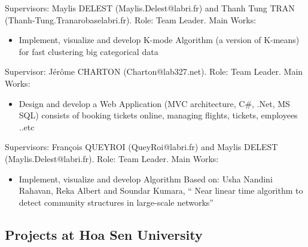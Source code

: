 \documentclass[11pt,a4paper,sans]{moderncv/moderncv}        %
\begin{document}
{Supervisors: Maylis DELEST (Maylis.Delest@labri.fr) and Thanh Tung TRAN (Thanh-Tung.Tranarobaselabri.fr).\newline{}%
Role: Team Leader.\newline{}%
Main Works:%
\begin{itemize}%
 \item Implement, visualize and develop K-mode Algorithm (a version of K-means) for fast clustering big categorical data 
\end{itemize}}

{Supervisor: Jérôme CHARTON (Charton@lab327.net).\newline{}%
Role: Team Leader.\newline{}%
Main Works:%
\begin{itemize}%
 \item Design and develop a Web Application (MVC architecture, C\#, .Net, MS SQL) consists of booking tickets online, managing flights, tickets, employees ..etc
\end{itemize}}

{Supervisors: François QUEYROI (QueyRoi@labri.fr) and Maylis DELEST  (Maylis.Delest@labri.fr).\newline{}%
Role: Team Leader.\newline{}%
Main Works:%
\begin{itemize}%
 \item Implement, visualize and develop Algorithm 
Based on: Usha Nandini Rahavan, Reka Albert and Soundar Kumara, “ Near linear time algorithm to detect community structures in large-scale networks”
\end{itemize}}


\subsection{Projects at Hoa Sen University}

\end{document}
